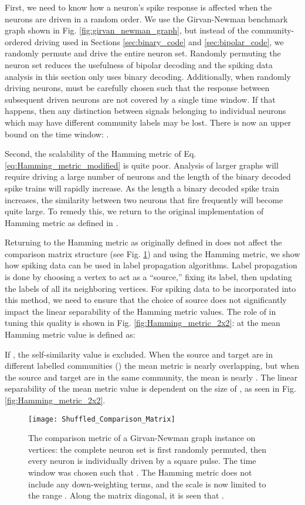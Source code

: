 \documentclass[sigconf]{acmart}
\begin{document}
First, we need to know how a neuron's spike response is affected when the neurons are driven in a random order. We use the Girvan-Newman benchmark graph shown in Fig. \ref{fig:girvan_newman_graph}, but instead of the community-ordered driving used in Sections \ref{sec:binary_code} and \ref{sec:bipolar_code}, we randomly permute and drive the entire neuron set. Randomly permuting the neuron set reduces the usefulness of bipolar decoding and the spiking data analysis in this section only uses binary decoding. Additionally, when randomly driving neurons,  must be carefully chosen such that the response between subsequent driven neurons are not covered by a single time window. If that happens, then any distinction between signals belonging to individual neurons which may have different community labels may be lost. There is now an upper bound on the time window: . 

Second, the scalability of the Hamming metric of Eq. \ref{eq:Hamming_metric_modified} is quite poor. Analysis of larger graphs will require driving a large number of neurons and the length of the binary decoded spike trains will rapidly increase.   As the length a binary decoded spike train increases, the similarity between two neurons that fire frequently will become quite large. To remedy this, we return to the original implementation of Hamming metric as defined in \cite{humphries2011spike}. 

Returning to the Hamming metric as originally defined in \cite{humphries2011spike} does not affect the comparison matrix structure (see Fig. \ref{fig:Comparison_matrix_2}) and using the Hamming metric, we show how spiking data can be used in label propagation algorithms. Label propagation is done by choosing a vertex to act as a ``source,'' fixing its label, then updating the labels of all its neighboring vertices. For spiking data to be incorporated into this method, we need to ensure that the choice of source does not significantly impact the linear separability of the Hamming metric values. The role of  in tuning this quality is shown in Fig. \ref{fig:Hamming_metric_2x2}: at  the mean Hamming metric value is defined as:

If , the self-similarity value  is excluded. When the source and target are in different labelled communities () the mean metric is nearly overlapping, but when the source and target are in the same community, the mean is nearly .  The linear separability of the mean metric value is dependent on the size of , as seen in Fig. \ref{fig:Hamming_metric_2x2}.
\begin{figure}
\texttt{[image: Shuffled\_Comparison\_Matrix]}
\caption{The comparison metric of a Girvan-Newman graph instance on  vertices: the complete neuron set is first randomly permuted, then every neuron is individually driven by a square pulse. The time window  was chosen such that . The Hamming metric does not include any down-weighting terms, and the scale is now limited to the range . Along the matrix diagonal, it is seen that .}
\label{fig:Comparison_matrix_2}
\end{figure}
\end{document}
